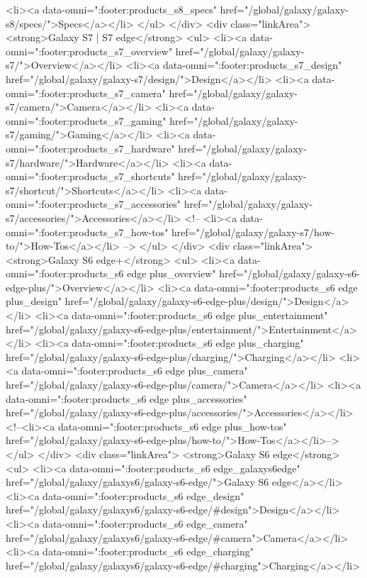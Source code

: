 {{{{{{{{{{{{{{{{{{{{{{{{{{{{{{{{{{{{{{{{{{{{{{{{{{{{{				<li><a data-omni=":footer:products_s8_specs" href="/global/galaxy/galaxy-s8/specs/">Specs</a></li>
			</ul>
		</div>
		<div class="linkArea">
			<strong>Galaxy S7 | S7 edge</strong>
			<ul>
				<li><a data-omni=":footer:products_s7_overview" href="/global/galaxy/galaxy-s7/">Overview</a></li>
				<li><a data-omni=":footer:products_s7_design" href="/global/galaxy/galaxy-s7/design/">Design</a></li>
				<li><a data-omni=":footer:products_s7_camera" href="/global/galaxy/galaxy-s7/camera/">Camera</a></li>
				<li><a data-omni=":footer:products_s7_gaming" href="/global/galaxy/galaxy-s7/gaming/">Gaming</a></li>
				<li><a data-omni=":footer:products_s7_hardware" href="/global/galaxy/galaxy-s7/hardware/">Hardware</a></li>
				<li><a data-omni=":footer:products_s7_shortcuts" href="/global/galaxy/galaxy-s7/shortcut/">Shortcuts</a></li>
				<li><a data-omni=":footer:products_s7_accessories" href="/global/galaxy/galaxy-s7/accessories/">Accessories</a></li>
				<!-- <li><a data-omni=":footer:products_s7_how-tos" href="/global/galaxy/galaxy-s7/how-to/">How-Tos</a></li> -->
			</ul>
		</div>
		<div class="linkArea">
			<strong>Galaxy S6 edge+</strong>
			<ul>
				<li><a data-omni=":footer:products_s6 edge plus_overview" href="/global/galaxy/galaxy-s6-edge-plus/">Overview</a></li>
				<li><a data-omni=":footer:products_s6 edge plus_design" href="/global/galaxy/galaxy-s6-edge-plus/design/">Design</a></li>
				<li><a data-omni=":footer:products_s6 edge plus_entertainment" href="/global/galaxy/galaxy-s6-edge-plus/entertainment/">Entertainment</a></li>
				<li><a data-omni=":footer:products_s6 edge plus_charging" href="/global/galaxy/galaxy-s6-edge-plus/charging/">Charging</a></li>
				<li><a data-omni=":footer:products_s6 edge plus_camera" href="/global/galaxy/galaxy-s6-edge-plus/camera/">Camera</a></li>
				<li><a data-omni=":footer:products_s6 edge plus_accessories" href="/global/galaxy/galaxy-s6-edge-plus/accessories/">Accessories</a></li>
				<!--<li><a data-omni=":footer:products_s6 edge plus_how-tos" href="/global/galaxy/galaxy-s6-edge-plus/how-to/">How-Tos</a></li>-->
			</ul>
		</div>
		<div class="linkArea">
			<strong>Galaxy S6 edge</strong>
			<ul>
				<li><a data-omni=":footer:products_s6 edge_galaxys6edge" href="/global/galaxy/galaxys6/galaxy-s6-edge/">Galaxy S6 edge</a></li>
				<li><a data-omni=":footer:products_s6 edge_design" href="/global/galaxy/galaxys6/galaxy-s6-edge/#design">Design</a></li>
				<li><a data-omni=":footer:products_s6 edge_camera" href="/global/galaxy/galaxys6/galaxy-s6-edge/#camera">Camera</a></li>
				<li><a data-omni=":footer:products_s6 edge_charging" href="/global/galaxy/galaxys6/galaxy-s6-edge/#charging">Charging</a></li>
}}}}}}}}}}}}}}}}}}}}}}}}}}}}}}}}}}}}}}}}}}}}}}}}}}}}}
